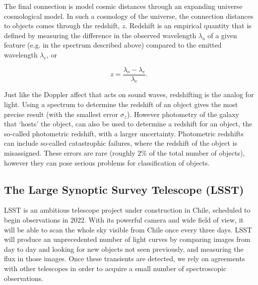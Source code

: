 \documentclass[\docopts]{\docclass}
\begin{document}
The final connection is model cosmic distances through an expanding universe cosmological model. In such a cosmology of the universe, the connection distances to objects comes through the redshift, $z$. Redshift is an empirical quantity that is defined by measuring the difference in the observed wavelength $\lambda_o$ of a given feature (e.g. in the spectrum described above) compared to the emitted wavelength $\lambda_e$, or

\begin{equation}
z = \frac{\lambda_o - \lambda_e}{\lambda_e}.
\end{equation}

Just like the Doppler affect that acts on sound waves, redshifting is the analog for light. Using a spectrum to determine the redshift of an object gives the most precise result (with the smallest error $\sigma_z$). However photometry of the galaxy that `hosts' the object, can also be used to determine a redshift for an object, the so-called photometric redshift, with a larger uncertainty. 
Photometric redshifts can include so-called catastrophic failures, where the redshift of the object is misassigned. These errors are rare (roughly $2\%$ of the total number of objects), however they can pose serious problems for classification of objects.


\subsection{The Large Synoptic Survey Telescope (LSST)}
LSST is an ambitious telescope project under construction in Chile, scheduled to begin observations in 2022. With its powerful camera and wide field of view, it will be able to scan the whole sky visible from Chile once every three days. LSST will produce an unprecedented number of light curves by comparing images from day to day and looking for new objects not seen previously, and measuring the flux in those images. Once these transients are detected, we rely on agreements with other telescopes in order to acquire a small number of spectroscopic observations.
\end{document}
